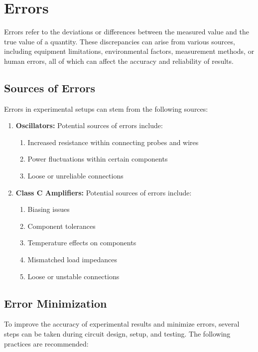 \documentclass[12pt,a4paper]{article}
\begin{document}
    \section{Errors}

    Errors refer to the deviations or differences between the measured value and the true value of a quantity. These discrepancies can arise from various sources, including equipment limitations, environmental factors, measurement methods, or human errors, all of which can affect the accuracy and reliability of results.

    \subsection{Sources of Errors}
    Errors in experimental setups can stem from the following sources:

    \begin{enumerate}
        \item \textbf{Oscillators:} Potential sources of errors include:
        \begin{enumerate}
            \item Increased resistance within connecting probes and wires
            \item Power fluctuations within certain components
            \item Loose or unreliable connections
        \end{enumerate}
        \item \textbf{Class C Amplifiers:} Potential sources of errors include:
        \begin{enumerate}
            \item Biasing issues
            \item Component tolerances
            \item Temperature effects on components
            \item Mismatched load impedances
            \item Loose or unstable connections
        \end{enumerate}
    \end{enumerate}

    \subsection{Error Minimization}

    To improve the accuracy of experimental results and minimize errors, several steps can be taken during circuit design, setup, and testing. The following practices are recommended:
\end{document}
